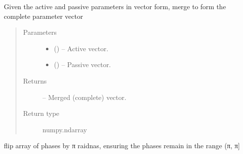\documentclass[letterpaper,10pt,english]{sphinxmanual}
\begin{document}
\begin{fulllineitems}
\begin{fulllineitems}
\label{\detokenize{references/nlp/nlp:nmrespy.nlp.nlp.NonlinearProgramming._merge_active_passive}}
\sphinxAtStartPar
Given the active and passive parameters in vector form, merge to
form the complete parameter vector
\begin{quote}\begin{description}
\item[{Parameters}] \leavevmode\begin{itemize}
\item {} 
\sphinxAtStartPar
{} () – Active vector.

\item {} 
\sphinxAtStartPar
{} (\sphinxstyleliteralemphasis{\sphinxupquote{,}}) – Passive vector.

\end{itemize}

\item[{Returns}] \leavevmode
\sphinxAtStartPar
{} – Merged (complete) vector.

\item[{Return type}] \leavevmode
\sphinxAtStartPar
numpy.ndarray

\end{description}\end{quote}

\end{fulllineitems}


\begin{fulllineitems}
\label{\detokenize{references/nlp/nlp:nmrespy.nlp.nlp.NonlinearProgramming._pi_flip}}
\sphinxAtStartPar
flip array of phases by π raidnas, ensuring the phases remain in
the range (\sphinxhyphen{}π, π{]}

\end{fulllineitems}


\end{fulllineitems}
\end{document}
